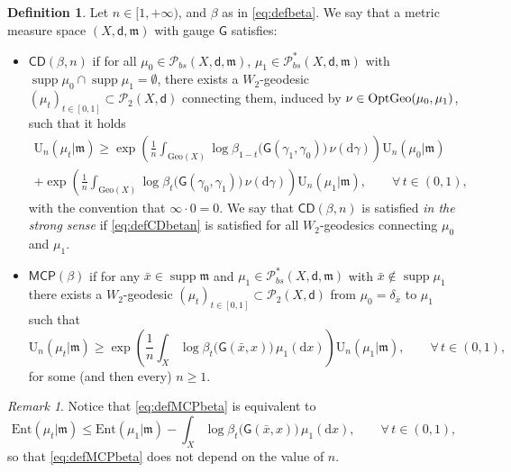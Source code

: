 \documentclass[11pt,a4paper]{article}
\theoremstyle{plain}
\theoremstyle{definition}
\newtheorem{definition}[theorem]{Definition}
\theoremstyle{remark}
\newtheorem{remark}[theorem]{Remark}
\numberwithin{equation}{section}
\DeclareMathOperator{\supp}{\mathrm{supp}}
\newcommand{\CD}{\mathsf{CD}}
\newcommand{\Geo}{\mathrm{Geo}}
\newcommand{\MCP}{\mathsf{MCP}}
\newcommand{\OptGeo}{{\rm OptGeo}}
\newcommand{\Ent}{\mathrm{Ent}}
\newcommand{\U}{\mathrm{U}}
\newcommand{\Prob}{\mathcal{P}}
\newcommand{\di}{\mathrm{d}}
\newcommand{\mm}{\mathfrak m}
\newcommand{\sfd}{\mathsf d}
\newcommand{\sfG}{\mathsf G}
\begin{document}
\begin{definition}\label{def:CDMCPbetan}
Let $n\in [1,+\infty)$, and $\beta$ as in \eqref{eq:defbeta}. We say that a  metric measure space $(X,\sfd,\mm)$ with gauge $\sfG$ satisfies:
\begin{itemize}
\item  $\CD(\beta, n)$ if for all $\mu_0\in \Prob_{bs}(X,\sfd,\mm)$, $\mu_1\in \Prob_{bs}^{*}(X,\sfd,\mm)$ with $\supp \mu_0\cap \supp \mu_1 =\emptyset$,  there exists a $W_2$-geodesic $(\mu_t)_{t\in[0,1]} \subset \Prob_2(X,\sfd)$ connecting them, induced by $\nu\in \OptGeo(\mu_0,\mu_1)$, such that it holds
\begin{multline}\label{eq:defCDbetan}
\U_{n}(\mu_{t}|\mm)\geq  \exp\left( \frac{1}{n}\int_{\Geo(X)} \log \beta_{1-t}\big(\sfG(\gamma_1,\gamma_0))\, \nu(\di\gamma) \right) \U_{n}(\mu_{0}|\mm)  \\
+\exp\left( \frac{1}{n}\int_{\Geo(X)} \log \beta_{t}\big(\sfG(\gamma_0,\gamma_1)\big) \, \nu(\di\gamma) \right)   \U_{n}(\mu_{1}|\mm), \qquad \forall\, t\in (0,1),
\end{multline}
with the convention that $\infty \cdot 0 = 0$. 
We say that $\CD(\beta, n)$ is satisfied \emph{in the strong sense} if \eqref{eq:defCDbetan} is satisfied for all $W_2$-geodesics connecting $\mu_0$ and $\mu_1$.
\item  $\MCP(\beta)$ if for any $\bar{x} \in \supp\mm$ and $\mu_1\in \Prob_{bs}^{*}(X,\sfd,\mm)$   with $\bar{x}\notin \supp \mu_1$ there exists a $W_2$-geodesic $(\mu_t)_{t\in[0,1]} \subset \Prob_2(X,\sfd)$ from $\mu_0=\delta_{\bar{x}}$ to $\mu_1$ such that
\begin{equation}\label{eq:defMCPbeta}
\U_{n}(\mu_{t}|\mm)\geq \exp\left( \frac{1}{n}\int_{X}  \log \beta_{t}\big(\sfG(\bar{x},x)\big)  \, \mu_1(\di x) \right) \U_{n}(\mu_{1}|\mm) , \qquad \forall\, t\in (0,1),
\end{equation}
for some (and then every) $n\geq 1$.
\end{itemize}
\end{definition}
\begin{remark}\label{rem:eqMCPbeta}
Notice that \eqref{eq:defMCPbeta} is equivalent to
\begin{equation}\label{eq:defMCPbeta2}
\Ent(\mu_t|\mm) \leq \Ent(\mu_1|\mm) - \int_X\log\beta_t\big(\sfG(\bar{x},x)\big)  \, \mu_1(\di x) , \qquad \forall\, t\in (0,1),
\end{equation}
so that \eqref{eq:defMCPbeta} does not depend on the value of $n$.
\end{remark}
\end{document}

